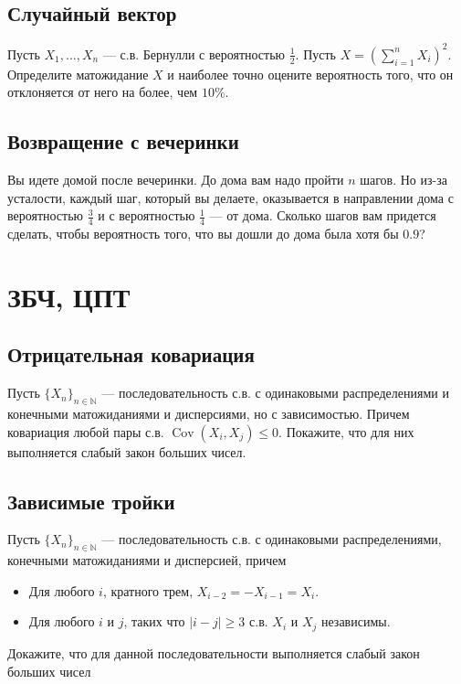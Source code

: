 \documentclass[12pt]{article}
\newcommand\N{\mathbb{N}}
\DeclareMathOperator{\Cov}{Cov}
\begin{document}
\subsection{Случайный вектор}

Пусть $X_1, \dots, X_n$ --- с.в. Бернулли с вероятностью $\frac{1}{2}$. Пусть $X = (\sum_{i = 1}^n X_i)^2$. Определите матожидание $X$ и наиболее точно оцените вероятность того, что он отклоняется от него на более, чем $10\%$.

\subsection{Возвращение с вечеринки}

Вы идете домой после вечеринки. До дома вам надо пройти $n$ шагов. Но из-за усталости, каждый шаг, который вы делаете, оказывается в направлении дома с вероятностью $\frac{3}{4}$ и с вероятностью $\frac{1}{4}$ --- от дома. Сколько шагов вам придется сделать, чтобы вероятность того, что вы дошли до дома была хотя бы $0.9$? 

\section{ЗБЧ, ЦПТ}

\subsection{Отрицательная ковариация}

Пусть $\{X_n\}_{n \in \N}$ --- последовательность с.в. с одинаковыми распределениями и конечными матожиданиями и дисперсиями, но с зависимостью. Причем ковариация любой пары с.в. $\Cov(X_i, X_j) \le 0$. Покажите, что для них выполняется слабый закон больших чисел.

\subsection{Зависимые тройки}
Пусть $\{X_n\}_{n \in \N}$ --- последовательность с.в. с одинаковыми распределениями, конечными матожиданиями и дисперсией, причем
\begin{itemize}
    \item Для любого $i$, кратного трем, $X_{i - 2} = - X_{i - 1} = X_{i}$. 
    \item Для любого $i$ и $j$, таких что $|i - j| \ge 3$ с.в. $X_i$ и $X_j$ независимы.
\end{itemize}
Докажите, что для данной последовательности выполняется слабый закон больших чисел
\end{document}
